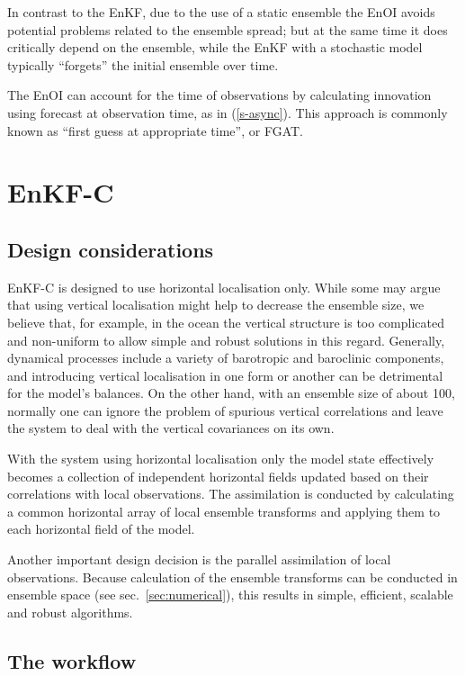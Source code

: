 \documentclass[11pt]{report}
\begin{document}
In contrast to the EnKF, due to the use of a static ensemble the EnOI avoids potential problems related to the ensemble spread; but at the same time it does critically depend on the ensemble, while the EnKF with a stochastic model typically ``forgets'' the initial ensemble over time.

The EnOI can account for the time of observations by calculating innovation using forecast at observation time, as in (\ref{s-async}).
This approach is commonly known as ``first guess at appropriate time'', or FGAT.

\chapter{EnKF-C}
\label{ch:enkf-c}

\section{Design considerations}

EnKF-C is designed to use horizontal localisation only.
While some may argue that using vertical localisation might help to decrease the ensemble size, we believe that, for example, in the ocean the vertical structure is too complicated and non-uniform to allow simple and robust solutions in this regard.
Generally, dynamical processes include a variety of barotropic and baroclinic components, and introducing vertical localisation in one form or another can be detrimental for the model's balances.
On the other hand, with an ensemble size of about 100, normally one can ignore the problem of spurious vertical correlations and leave the system to deal with the vertical covariances on its own.

With the system using horizontal localisation only the model state effectively becomes a collection of independent horizontal fields updated based on their correlations with local observations.
The assimilation is conducted by calculating a common horizontal array of local ensemble transforms and applying them to each horizontal field of the model.

Another important design decision is the parallel assimilation of local observations.
Because calculation of the ensemble transforms can be conducted in ensemble space (see sec.~\ref{sec:numerical}), this results in simple, efficient, scalable and robust algorithms.

\section{The workflow}
\end{document}
